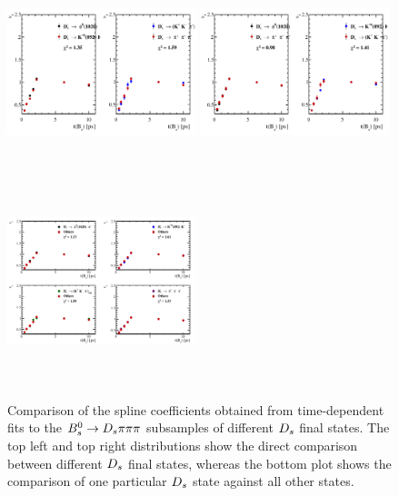    
\begin{figure}[h]
\includegraphics[height=6.0cm,width=0.49\textwidth]{figs/timeAcc_combined_by_DsFinalState_mod_adaptive.pdf}
\includegraphics[height=6.0cm,width=0.49\textwidth]{figs/timeAcc_combined_by_DsFinalState_mod2_adaptive.pdf}\\
\includegraphics[height=6.0cm,width=0.49\textwidth]{figs/timeAcc_combined_by_DsFinalState_adaptive.pdf}
\caption{Comparison of the spline coefficients obtained from time-dependent fits to the ${{B}^0_{s}}\rightarrow{\ensuremath{{D}_{s}}}{\ensuremath{\pi}}{\ensuremath{\pi}}{\ensuremath{\pi}}$ subsamples of different ${{D}_{s}}$ final states. 
The top left and top right distributions show the direct comparison between different ${{D}_{s}}$ final states, whereas the bottom plot shows the comparison of one particular ${{D}_{s}}$ state against all other states.}
\label{fig:AccCompDs}
\end{figure}

